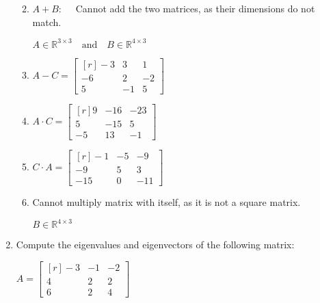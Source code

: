 \documentclass[11pt, oneside, letter]{article}
\begin{document}
\begin{enumerate}
\begin{enumerate}
		\pagebreak
		
		\item $A + B: \quad$
		Cannot add the two matrices, as their dimensions do not match.
		\begin{center}
		$A \in \mathbb{R}^{3 \times 3} \quad \mbox{and} \quad B \in \mathbb{R}^{4 \times 3}$
		\end{center}
		
		\item $A - C = 
		\begin{bmatrix*}[r]
		-3 & 3 & 1 \\ -6 & 2 & -2 \\ 5 & -1 & 5
		\end{bmatrix*}$
		
		\item $A \cdot C = 
		\begin{bmatrix*}[r]
		9 & -16 & -23 \\ 5 & -15 & 5 \\ -5 & 13 & -1
		\end{bmatrix*}$
		
		\item $C \cdot A = 
		\begin{bmatrix*}[r]
		-1 & -5 & -9 \\ -9 & 5 & 3 \\ -15 & 0 & -11
		\end{bmatrix*}$
		
		\item Cannot multiply matrix with itself, as it is not a square matrix.
		\begin{center}
		$B \in \mathbb{R}^{4 \times 3}$
		\end{center}
		
		\end{enumerate}
	
\vspace{4ex}

	
	\item Compute the eigenvalues and eigenvectors of the following matrix:
	
	\begin{center} 
	$A = \begin{bmatrix*}[r]
	-3 & -1 & -2 \\ 4 & 2 & 2 \\ 6 & 2 & 4
	\end{bmatrix*}$
	\end{center}
	

\end{enumerate}
\end{document}
